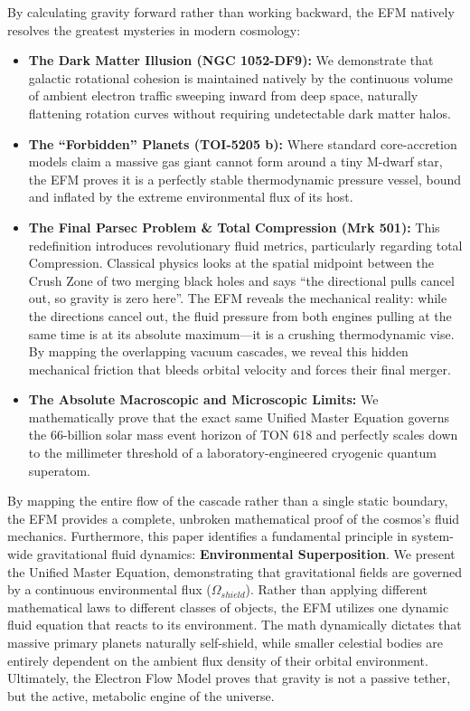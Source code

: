 \documentclass[11pt, a4paper]{article}
\begin{document}
  By calculating gravity forward rather than working backward, the EFM natively resolves the greatest mysteries in modern cosmology:
  \begin{itemize}
    \item \textbf{The Dark Matter Illusion (NGC 1052-DF9):} We demonstrate that galactic rotational cohesion is maintained natively by the continuous volume of ambient electron traffic sweeping inward from deep space, naturally flattening rotation curves without requiring undetectable dark matter halos.
    \item \textbf{The ``Forbidden'' Planets (TOI-5205 b):} Where standard core-accretion models claim a massive gas giant cannot form around a tiny M-dwarf star, the EFM proves it is a perfectly stable thermodynamic pressure vessel, bound and inflated by the extreme environmental flux of its host.
    \item \textbf{The Final Parsec Problem \& Total Compression (Mrk 501):} This redefinition introduces revolutionary fluid metrics, particularly regarding total Compression. Classical physics looks at the spatial midpoint between the Crush Zone of two merging black holes and says ``the directional pulls cancel out, so gravity is zero here''. The EFM reveals the mechanical reality: while the directions cancel out, the fluid pressure from both engines pulling at the same time is at its absolute maximum---it is a crushing thermodynamic vise. By mapping the overlapping vacuum cascades, we reveal this hidden mechanical friction that bleeds orbital velocity and forces their final merger.
    \item \textbf{The Absolute Macroscopic and Microscopic Limits:} We mathematically prove that the exact same Unified Master Equation governs the 66-billion solar mass event horizon of TON 618 and perfectly scales down to the millimeter threshold of a laboratory-engineered cryogenic quantum superatom.
  \end{itemize}

  By mapping the entire flow of the cascade rather than a single static boundary, the EFM provides a complete, unbroken mathematical proof of the cosmos's fluid mechanics. Furthermore, this paper identifies a fundamental principle in system-wide gravitational fluid dynamics: \textbf{Environmental Superposition}. We present the Unified Master Equation, demonstrating that gravitational fields are governed by a continuous environmental flux ($\Omega_{shield}$). Rather than applying different mathematical laws to different classes of objects, the EFM utilizes one dynamic fluid equation that reacts to its environment. The math dynamically dictates that massive primary planets naturally self-shield, while smaller celestial bodies are entirely dependent on the ambient flux density of their orbital environment. Ultimately, the Electron Flow Model proves that gravity is not a passive tether, but the active, metabolic engine of the universe.
\end{document}

